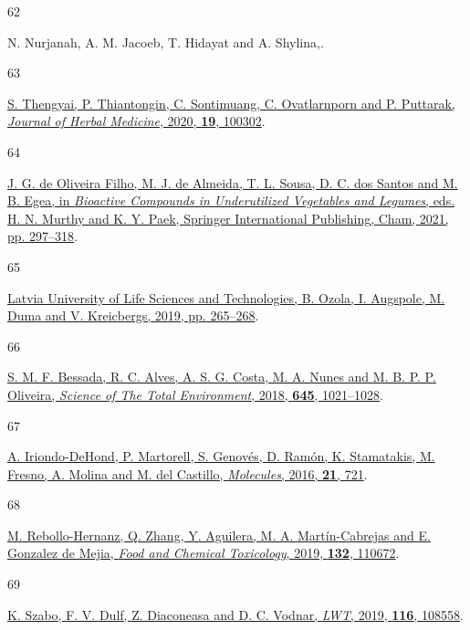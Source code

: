 \documentclass[
  letterpaper,
  DIV=11,
  numbers=noendperiod]{scrartcl}
\newlength{\cslhangindent}
\newlength{\csllabelwidth}
\newenvironment{CSLReferences}[2] %
 {\begin{list}{}{%
  \setlength{\itemindent}{0pt}
  \setlength{\leftmargin}{0pt}
  \setlength{\parsep}{0pt}
  \ifodd #1
   \setlength{\leftmargin}{\cslhangindent}
   \setlength{\itemindent}{-1\cslhangindent}
  \fi
  \setlength{\itemsep}{#2\baselineskip}}}
 {\end{list}}
\newcommand{\CSLLeftMargin}[1]{\parbox[t]{\csllabelwidth}{\strut#1\strut}}
\newcommand{\CSLRightInline}[1]{\parbox[t]{\linewidth - \csllabelwidth}{\strut#1\strut}}
\begin{document}
\begin{CSLReferences}{0}{0}
\CSLLeftMargin{62 }%
\CSLRightInline{N. Nurjanah, A. M. Jacoeb, T. Hidayat and A. Shylina,.}

\CSLLeftMargin{63 }%
\CSLRightInline{\href{https://doi.org/10.1016/j.hermed.2019.100302}{S.
Thengyai, P. Thiantongin, C. Sontimuang, C. Ovatlarnporn and P.
Puttarak, \emph{Journal of Herbal Medicine}, 2020, \textbf{19},
100302}.}

\CSLLeftMargin{64 }%
\CSLRightInline{\href{https://doi.org/10.1007/978-3-030-57415-4_37}{J.
G. de Oliveira Filho, M. J. de Almeida, T. L. Sousa, D. C. dos Santos
and M. B. Egea, in \emph{Bioactive {Compounds} in {Underutilized
Vegetables} and {Legumes}}, eds. H. N. Murthy and K. Y. Paek, {Springer
International Publishing}, {Cham}, 2021, pp. 297--318}.}

\CSLLeftMargin{65 }%
\CSLRightInline{\href{https://doi.org/10.22616/FoodBalt.2019.050}{Latvia
University of Life Sciences and Technologies, B. Ozola, I. Augspole, M.
Duma and V. Kreicbergs, 2019, pp. 265--268}.}

\CSLLeftMargin{66 }%
\CSLRightInline{\href{https://doi.org/10.1016/j.scitotenv.2018.07.201}{S.
M. F. Bessada, R. C. Alves, A. S. G. Costa, M. A. Nunes and M. B. P. P.
Oliveira, \emph{Science of The Total Environment}, 2018, \textbf{645},
1021--1028}.}

\CSLLeftMargin{67 }%
\CSLRightInline{\href{https://doi.org/10.3390/molecules21060721}{A.
Iriondo-DeHond, P. Martorell, S. Genovés, D. Ramón, K. Stamatakis, M.
Fresno, A. Molina and M. del Castillo, \emph{Molecules}, 2016,
\textbf{21}, 721}.}

\CSLLeftMargin{68 }%
\CSLRightInline{\href{https://doi.org/10.1016/j.fct.2019.110672}{M.
Rebollo-Hernanz, Q. Zhang, Y. Aguilera, M. A. Martín-Cabrejas and E.
Gonzalez de Mejia, \emph{Food and Chemical Toxicology}, 2019,
\textbf{132}, 110672}.}

\CSLLeftMargin{69 }%
\CSLRightInline{\href{https://doi.org/10.1016/j.lwt.2019.108558}{K.
Szabo, F. V. Dulf, Z. Diaconeasa and D. C. Vodnar, \emph{LWT}, 2019,
\textbf{116}, 108558}.}


\end{CSLReferences}
\end{document}
